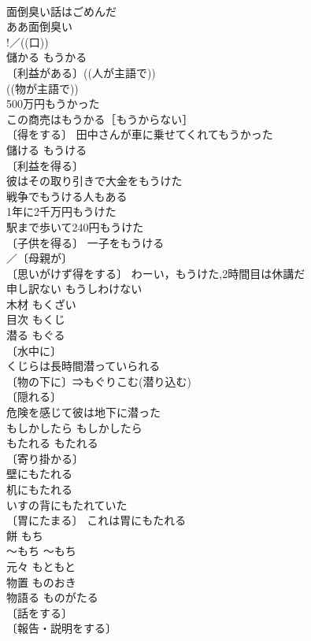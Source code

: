 \documentclass[8pt]{extreport}
\begin{document}
\begin{CJK}{UTF8}{min}
\\	面倒臭い話はごめんだ 
\\	ああ面倒臭い 
\\	!／((口)) 
\\	儲かる	もうかる	
\\	〔利益がある〕((人が主語で)) 
\\	((物が主語で)) 
\\	500万円もうかった 
\\	この商売はもうかる［もうからない］ 
\\	〔得をする〕 田中さんが車に乗せてくれてもうかった 
\\	儲ける	もうける	
\\	〔利益を得る〕
\\	彼はその取り引きで大金をもうけた 
\\	戦争でもうける人もある 
\\	1年に2千万円もうけた 
\\	駅まで歩いて240円もうけた 
\\	〔子供を得る〕 一子をもうける 
\\	／〔母親が〕
\\	〔思いがけず得をする〕 わーい，もうけた,2時間目は休講だ 
\\	申し訳ない	もうしわけない	
\\	木材	もくざい	
\\	目次	もくじ	
\\	潜る	もぐる	
\\	〔水中に〕
\\	くじらは長時間潜っていられる 
\\	〔物の下に〕⇒もぐりこむ(潜り込む) 
\\	〔隠れる〕
\\	危険を感じて彼は地下に潜った 
\\	もしかしたら	もしかしたら	
\\	もたれる	もたれる	
\\	〔寄り掛かる〕
\\	壁にもたれる 
\\	机にもたれる 
\\	いすの背にもたれていた 
\\	〔胃にたまる〕 これは胃にもたれる 
\\	餅	もち	
\\	～もち	～もち	
\\	元々	もともと	
\\	物置	ものおき	
\\	物語る	ものがたる	
\\	〔話をする〕
\\	〔報告・説明をする〕

\end{CJK}
\end{document}
